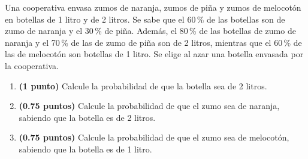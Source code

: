 
Una cooperativa envasa zumos de naranja, zumos de piña y zumos de melocotón
en botellas de 1 litro y de 2 litros. Se sabe que el 60\,\% de las botellas
son de zumo de naranja y el 30\,\% de piña. Además, el 80\,\% de las
botellas de zumo de naranja y el 70\,\% de las de zumo de piña son de
2 litros, mientras que el 60\,\% de las de melocotón son botellas de 1 litro.
Se elige al azar una botella envasada por la cooperativa.
\begin{enumerate}[label=\alph*)]
  \item \textbf{(1 punto)} Calcule la probabilidad de que la botella sea de
  2 litros.
  \item \textbf{(0.75 puntos)} Calcule la probabilidad de que el zumo sea de
  naranja, sabiendo que la botella es de 2 litros.
  \item \textbf{(0.75 puntos)} Calcule la probabilidad de que el zumo sea de
  melocotón, sabiendo que la botella es de 1 litro.
\end{enumerate}
